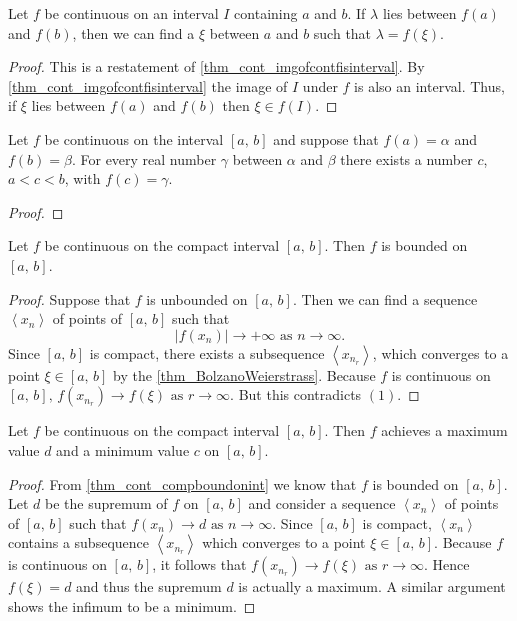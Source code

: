 \documentclass[10pt, a4paper]{article}
\newcommand{\limas}[3][n]{#2 \rightarrow #3 \text{ as } #1 \rightarrow \infty}
\newcommand{\seq}[1][x_n]{\left\langle #1 \right\rangle}
\begin{document}
\begin{corollary}\label{col_cont_intermval}
    Let $f$ be continuous on an interval $I$ containing $a$ and $b$. If $\lambda$ lies between $f(a)$ and $f(b)$, then we can find a $\xi$ between $a$ and $b$ such that $\lambda = f(\xi)$.
    \begin{proof}
        This is a restatement of \autoref{thm_cont_imgofcontfisinterval}. By \autoref{thm_cont_imgofcontfisinterval} the image of $I$ under $f$ is also an interval. Thus, if $\xi$ lies between $f(a)$ and $f(b)$ then $\xi \in f(I)$.
    \end{proof}
\end{corollary}

\begin{theorem}\label{thm_cont_intermval}
    Let $f$ be continuous on the interval $[a,\,b]$ and suppose that $f(a) = \alpha$ and $f(b) = \beta$. For every real number $\gamma$ between $\alpha$ and $\beta$ there exists a number $c$, $a < c < b$, with $f(c) = \gamma$.
    \begin{proof}
        
    \end{proof}
\end{theorem}

\begin{theorem}\label{thm_cont_compboundonint}
    Let $f$ be continuous on the compact interval $[a,\,b]$. Then $f$ is bounded on $[a,\,b]$.
    \begin{proof}
    Suppose that $f$ is unbounded on $[a,\,b]$. Then we can find a sequence $\seq$ of points of $[a,\,b]$ such that
    \begin{equation}
        \limas{|f(x_n)|}{+\infty}.
    \end{equation}
    Since $[a,\,b]$ is compact, there exists a subsequence $\seq[x_{n_r}]$, which converges to a point $\xi \in [a,\,b]$ by the \autoref{thm_BolzanoWeierstrass}. Because $f$ is continuous on $[a,\,b],\, \limas[r]{f(x_{n_r})}{f(\xi)}$. But this contradicts $(1)$.
    \end{proof}
\end{theorem}

\begin{theorem}
    Let $f$ be continuous on the compact interval $[a,\,b]$. Then $f$ achieves a maximum value $d$ and a minimum value $c$ on $[a,\,b]$.
    \begin{proof}
        From \autoref{thm_cont_compboundonint} we know that $f$ is bounded on $[a,\,b]$. Let $d$ be the supremum of $f$ on $[a,\,b]$ and consider a sequence $\seq$ of points of $[a,\,b]$ such that $\limas{f(x_n)}{d}$. Since $[a,\,b]$ is compact, $\seq$ contains a subsequence $\seq[x_{n_r}]$ which converges to a point $\xi \in [a,\,b]$. Because $f$ is continuous on $[a,\,b]$, it follows that $\limas[r]{f(x_{n_r})}{f(\xi)}$. Hence $f(\xi) = d$ and thus the supremum $d$ is actually a maximum. A similar argument shows the infimum to be a minimum.
    \end{proof}
\end{theorem}
\end{document}
